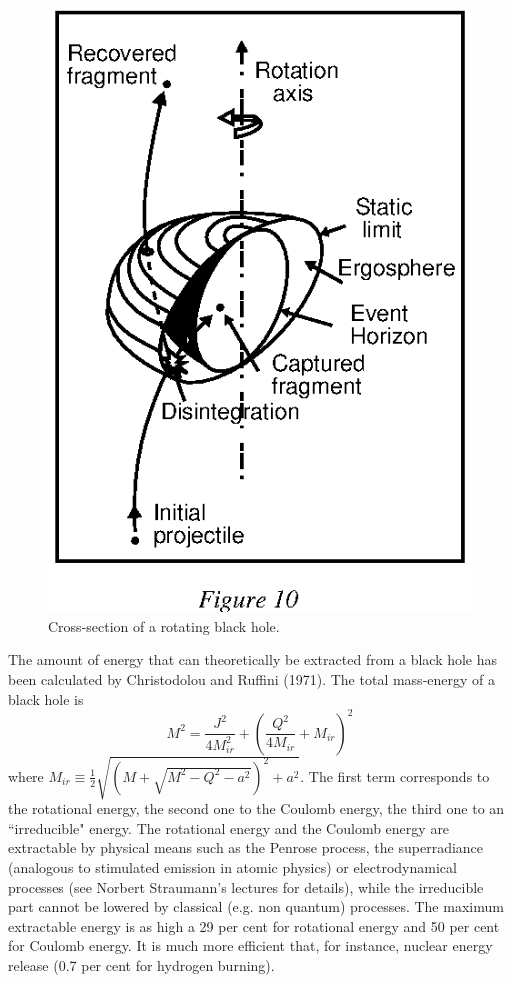 \documentclass[12pt]{article}
\begin{document}
\begin{figure}[tb]
  \begin{center}
    \leavevmode
    \includegraphics{ergo.ps}       
    \caption{Cross-section of a rotating black hole.}
  \end{center}
\end{figure}
The amount of energy that
can theoretically be extracted from a black hole has been calculated by
Christodolou and Ruffini (1971). The total mass-energy of a black hole is
\begin{equation}
        M^2 = \frac{J^2}{4M_{ir}^2} + (\frac{Q^2}{4 M_{ir}} + M_{ir})^2
\end{equation}
where 
$M_{ir} \equiv \frac{1}{2}\sqrt{\left(M+\sqrt{M^2-Q^2-a^2}\right)^2+a^2}$.
The first term corresponds to the rotational energy, the second one to the
Coulomb energy, the third one to an ``irreducible" energy.  The rotational
energy and the Coulomb energy are extractable by physical means such as
the Penrose process, the superradiance (analogous to stimulated emission in
atomic physics) or electrodynamical processes (see Norbert Straumann's
lectures for details), while the irreducible part
cannot be lowered by classical (e.g. non quantum) processes. The maximum
extractable  energy is as high a 29 per cent for rotational energy and 50 per
cent for Coulomb energy. It is much more efficient that, for instance,  nuclear
energy release (0.7 per cent for hydrogen burning). 
\end{document}
